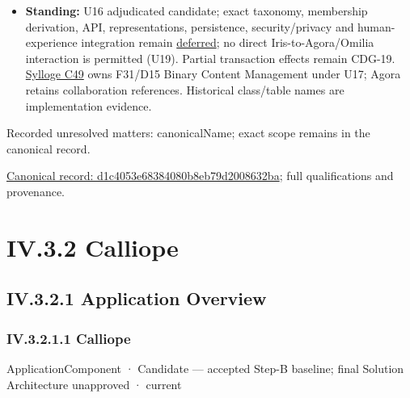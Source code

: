\begin{itemize}
\item \textbf{Standing:} U16 adjudicated candidate; exact taxonomy, membership derivation,
  API, representations, persistence, security/privacy and human-experience
  integration remain \hyperref[element:d1c4053e68384080b8eb79d2008632ba]{deferred};
  no direct Iris-to-Agora/Omilia interaction is permitted (U19).
  Partial transaction effects remain CDG-19. \hyperref[element:feea742463b84021b66853d287d8916f]{Sylloge C49} owns F31/D15
  Binary Content Management under U17; Agora retains collaboration references.
  Historical class/table names are implementation evidence.

\end{itemize}

{\small Recorded unresolved matters: canonicalName; exact scope remains in the canonical record.}\par
{\footnotesize \href{../../../../../../../../continuum/application/application-component/d1c4053e68384080b8eb79d2008632ba.md}{Canonical record: d1c4053e68384080b8eb79d2008632ba}; full qualifications and provenance.}\par
\section*{IV.3.2 Calliope}
\label{navigation:IV.3.2}

\subsection*{IV.3.2.1 Application Overview}
\label{navigation:IV.3.2.1}

\subsubsection*{IV.3.2.1.1 Calliope}
\label{navigation:IV.3.2.1.1}

\label{element:466ad8f75a954c0581b5bba090443849}
{\small ApplicationComponent · Candidate — accepted Step-B baseline; final Solution Architecture unapproved · current}\par


